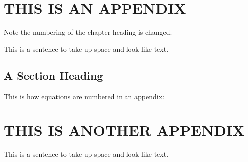 \documentclass{thesis}
\begin{document}

\appendix    %


\chapter{THIS IS AN APPENDIX}

Note the numbering of the chapter heading is changed.

This is a sentence to take up space and look like text.

\section{A Section Heading}

This is how equations are numbered in an appendix:

%
%



\chapter{THIS IS ANOTHER APPENDIX}

This is a sentence to take up space and look like text.
\end{document}
